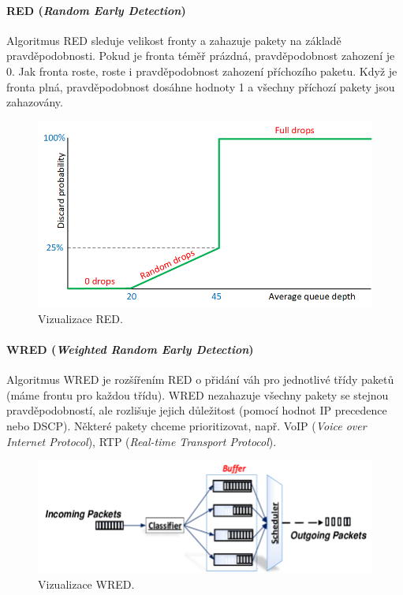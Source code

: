 \paragraph*{RED (\textit{Random Early Detection})} Algoritmus RED sleduje velikost fronty a zahazuje pakety na základě pravděpodobnosti. Pokud je fronta téměř prázdná, pravděpodobnost zahození je 0. Jak fronta roste, roste i pravděpodobnost zahození příchozího paketu. Když je fronta plná, pravděpodobnost dosáhne hodnoty 1 a všechny příchozí pakety jsou zahazovány.

\begin{figure}[H]
    \centering
    \includegraphics[width=0.9\linewidth]{red.png}
    \caption{Vizualizace RED.}
\end{figure}

\paragraph*{WRED (\textit{Weighted Random Early Detection})} Algoritmus WRED je rozšířením RED o přidání váh pro jednotlivé třídy paketů (máme frontu pro každou třídu). WRED nezahazuje všechny pakety se stejnou pravděpodobností, ale rozlišuje jejich důležitost (pomocí hodnot IP precedence nebo DSCP). Některé pakety chceme prioritizovat, např. VoIP (\textit{Voice over Internet Protocol}), RTP (\textit{Real-time Transport Protocol}).

\begin{figure}[H]
    \centering
    \includegraphics[width=1\linewidth]{wred.png}
    \caption{Vizualizace WRED.}
\end{figure}

